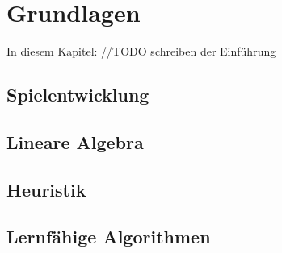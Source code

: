 \chapter{Grundlagen}
\label{cha:grundlagen}

In diesem Kapitel: //TODO schreiben der Einführung

\section{Spielentwicklung}

\section{Lineare Algebra}

\section{Heuristik}

\section{Lernfähige Algorithmen}